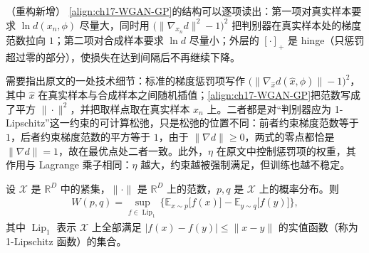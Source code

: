\documentclass[../../main.tex]{subfiles}
\begin{document}
\begin{remark}（重构新增）
\eqref{align:ch17-WGAN-GP}的结构可以逐项读出：第一项对真实样本要求 $\ln d(x_n,\phi)$ 尽量大，同时用 $\big(\|\nabla_{x_n}d\|^{2}-1\big)^{2}$ 把判别器在真实样本处的梯度范数拉向 $1$；第二项对合成样本要求 $\ln d$ 尽量小；外层的 $[\cdot]_+$ 是 hinge（只惩罚超过零的部分），使损失在达到间隔后不再继续下降。

需要指出原文的一处技术细节：标准的梯度惩罚项写作 $\big(\|\nabla_{\hat{x}}d(\hat{x},\phi)\|-1\big)^2$，其中 $\hat{x}$ 在真实样本与合成样本之间随机插值；\eqref{align:ch17-WGAN-GP}把范数写成了平方 $\|\cdot\|^{2}$，并把取样点取在真实样本 $x_n$ 上。二者都是对“判别器应为 1-Lipschitz”这一约束的可计算松弛，只是松弛的位置不同：前者约束梯度范数等于 $1$，后者约束梯度范数的平方等于 $1$，由于 $\|\nabla d\|\geqslant0$，两式的零点都恰是 $\|\nabla d\|=1$，故在最优点处二者一致。此外，$\eta$ 在原文中控制惩罚项的权重，其作用与 Lagrange 乘子相同：$\eta$ 越大，约束越被强制满足，但训练也越不稳定。
\end{remark}

\begin{proposition}\label{proposition:ch17-KR对偶}
设 $\mathcal{X}$ 是 $\mathbb{R}^D$ 中的紧集，$\|\cdot\|$ 是 $\mathbb{R}^D$ 上的范数，$p,q$ 是 $\mathcal{X}$ 上的概率分布。则
\begin{align}
W(p,q)=\sup_{f\in\operatorname{Lip}_1}\Big\{\mathbb{E}_{x\sim p}\big[f(x)\big]-\mathbb{E}_{y\sim q}\big[f(y)\big]\Big\},
\label{align:ch17-KR对偶}
\end{align}
其中 $\operatorname{Lip}_1$ 表示 $\mathcal{X}$ 上全部满足 $|f(x)-f(y)|\leqslant\|x-y\|$ 的实值函数（称为 1-Lipschitz 函数）的集合。
\end{proposition}
\end{document}
